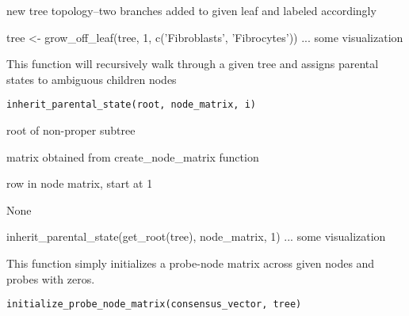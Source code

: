 \documentclass[a4paper]{book}
\begin{document}
%
\begin{Value}
new tree topology--two branches added to given leaf and labeled 
accordingly
\end{Value}
%
\begin{Examples}
\begin{ExampleCode}
tree <- grow_off_leaf(tree, 1, c('Fibroblasts', 'Fibrocytes'))
... some visualization 
\end{ExampleCode}
\end{Examples}
%
\begin{Description}\relax
This function will recursively walk through a given tree and assigns 
parental states to ambiguous children nodes
\end{Description}
%
\begin{Usage}
\begin{verbatim}
inherit_parental_state(root, node_matrix, i)
\end{verbatim}
\end{Usage}
%
\begin{Arguments}
\begin{ldescription}
\item[\code{root}] root of non-proper subtree

\item[\code{node\_matrix}] matrix obtained from create\_node\_matrix function

\item[\code{i}] row in node matrix, start at 1
\end{ldescription}
\end{Arguments}
%
\begin{Value}
None
\end{Value}
%
\begin{Examples}
\begin{ExampleCode}
inherit_parental_state(get_root(tree), node_matrix, 1)
... some visualization 
\end{ExampleCode}
\end{Examples}
%
\begin{Description}\relax
This function simply initializes a probe-node matrix across given nodes and 
probes with zeros.
\end{Description}
%
\begin{Usage}
\begin{verbatim}
initialize_probe_node_matrix(consensus_vector, tree)
\end{verbatim}
\end{Usage}
\end{document}
